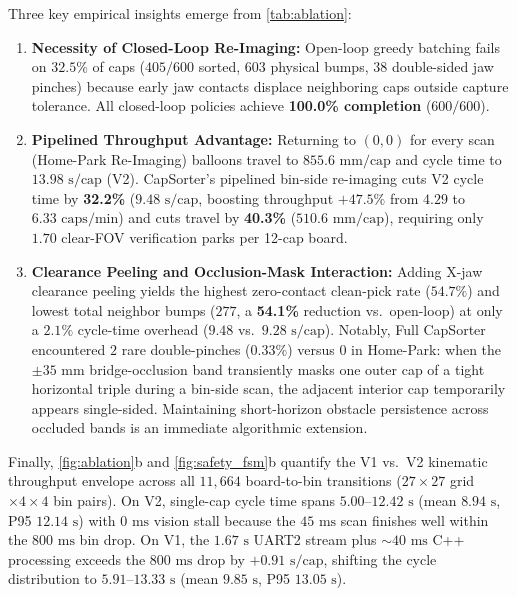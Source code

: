 \documentclass[10pt,twocolumn,letterpaper]{article}
\begin{document}
Three key empirical insights emerge from \cref{tab:ablation}:
\begin{enumerate}
  \item \textbf{Necessity of Closed-Loop Re-Imaging:} Open-loop greedy batching fails on $32.5\%$ of caps ($405/600$ sorted, $603$ physical bumps, $38$ double-sided jaw pinches) because early jaw contacts displace neighboring caps outside capture tolerance. All closed-loop policies achieve \textbf{100.0\% completion} ($600/600$).
  \item \textbf{Pipelined Throughput Advantage:} Returning to $(0,0)$ for every scan (Home-Park Re-Imaging) balloons travel to $855.6\text{ mm/cap}$ and cycle time to $13.98\text{ s/cap}$ (V2). CapSorter's pipelined bin-side re-imaging cuts V2 cycle time by \textbf{32.2\%} ($9.48\text{ s/cap}$, boosting throughput $+47.5\%$ from $4.29$ to $6.33\text{ caps/min}$) and cuts travel by \textbf{40.3\%} ($510.6\text{ mm/cap}$), requiring only $1.70$ clear-FOV verification parks per 12-cap board.
  \item \textbf{Clearance Peeling and Occlusion-Mask Interaction:} Adding X-jaw clearance peeling yields the highest zero-contact clean-pick rate ($54.7\%$) and lowest total neighbor bumps ($277$, a \textbf{54.1\%} reduction vs.\ open-loop) at only a $2.1\%$ cycle-time overhead ($9.48$ vs.\ $9.28\text{ s/cap}$). Notably, Full CapSorter encountered $2$ rare double-pinches ($0.33\%$) versus $0$ in Home-Park: when the $\pm 35\text{ mm}$ bridge-occlusion band transiently masks one outer cap of a tight horizontal triple during a bin-side scan, the adjacent interior cap temporarily appears single-sided. Maintaining short-horizon obstacle persistence across occluded bands is an immediate algorithmic extension.
\end{enumerate}

Finally, \cref{fig:ablation}b and \cref{fig:safety_fsm}b quantify the V1 vs.\ V2 kinematic throughput envelope across all $11{,}664$ board-to-bin transitions ($27\times 27$ grid $\times 4\times 4$ bin pairs). On V2, single-cap cycle time spans $5.00\text{--}12.42\text{ s}$ (mean $8.94\text{ s}$, P95 $12.14\text{ s}$) with $0\text{ ms}$ vision stall because the $45\text{ ms}$ scan finishes well within the $800\text{ ms}$ bin drop. On V1, the $1.67\text{ s}$ UART2 stream plus $\sim 40\text{ ms}$ C++ processing exceeds the $800\text{ ms}$ drop by $+0.91\text{ s/cap}$, shifting the cycle distribution to $5.91\text{--}13.33\text{ s}$ (mean $9.85\text{ s}$, P95 $13.05\text{ s}$).
\end{document}
